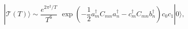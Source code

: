 \begin{equation}
\label{eq:OscillatorFormOfSmallT} |\mathcal{T}(T)\rangle \sim \frac{
  e^{2 \pi^2 /T}}{ T^6}\,\, \exp \left( -\frac{1}{2} a^{\dagger}_m
C_{mn} a^{\dagger}_n - c^{\dagger}_m C_{mn} b^{\dagger}_n \right) c_0
c_1 |0\rangle, 
\end{equation}


